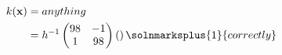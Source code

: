 \begin{align*}
k(\mathbf{x})&=anything \\
&=h^{-1}\begin{pmatrix}
98&-1\\1& 98
\end{pmatrix}\left(\right)\solnmarksplus{1}{correctly}\\
\end{align*}
